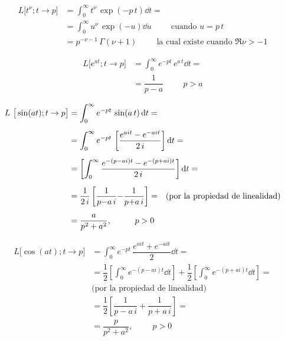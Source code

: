 \begin{ejemplo}
\begin{align*}
L \big[t^{\nu}; t \to p\big] &= \int_{0}^{\infty} t^{\nu} \, \exp(- p \, t) \dd{t} = \\[0.5em]
&= \int_{0}^{\infty} u^{\nu} \, \exp(-u) \dd{u} \hspace{1cm} \mbox{cuando  } u = p \, t \\[0.5em]
&= p^{-\nu - 1} \, \Gamma (\nu + 1) \hspace{1cm} \mbox{la cual existe cuando  } \Re{\nu} > - 1
\end{align*}
\end{ejemplo}

\begin{ejemplo}
\begin{align*}
L \big[e^{a t}; t \to p\big] &= \int_{0}^{\infty} e^{-p t} \, e^{a \, t} \dd{t} = \\[0.5em]
&= \dfrac{1}{p - a} \hspace{1cm} p > a
\end{align*}
\end{ejemplo}

\begin{ejemplo}
\begin{align*}
L \big[\sin (a t); t \to p\big] &= \int_{0}^{\infty} e^{-p t} \, \sin (a \, t) \dd{t} = \\[0.5em]
&= \int_{0}^{\infty} e^{-p t} \,\left[ \dfrac{e^{a i t} - e^{- a i t}}{2 \, i} \right] \dd{t} = \\[0.5em]
&= \left[ \int_{0}^{\infty}  \dfrac{e^{-(p - a i) t} - e^{- (p + a i) t}}{2 \, i} \right] \dd{t} = \\[0.5em]
&= \dfrac{1}{2 \, i} \left[ \dfrac{1}{p {-} a \, i} {-} \dfrac{1}{p {+} a \, i} \right] = \hspace{0.25cm} \mbox{(por la propiedad de linealidad)} \\[0.5em]
&= \dfrac{a}{p^{2} + a^{2}}, \hspace{1cm} p > 0
\end{align*}
\end{ejemplo}

\begin{ejemplo}
\begin{align*}
L \big[\cos (a t); t \to p\big] &= \int_{0}^{\infty} e^{-p t} \,\dfrac{e^{a i t} + e^{- a i t}}{2} \dd{t} = \\[0.5em]
&= \dfrac{1}{2} \left[ \int_{0}^{\infty} e^{-(p - a i) t} \dd{t} \right] + \dfrac{1}{2} \left[ \int_{0}^{\infty} e^{-(p + a i) t} \dd{t} \right] = \\[0.5em]
&\mbox{(por la propiedad de linealidad)} \\[0.5em]
&= \dfrac{1}{2} \left[ \dfrac{1}{p - a \, i} + \dfrac{1}{p + a \, i}\right] = \\[0.5em]
&= \dfrac{p}{p^{2} + a^{2}}, \hspace{1cm} p > 0
\end{align*}
\end{ejemplo}

